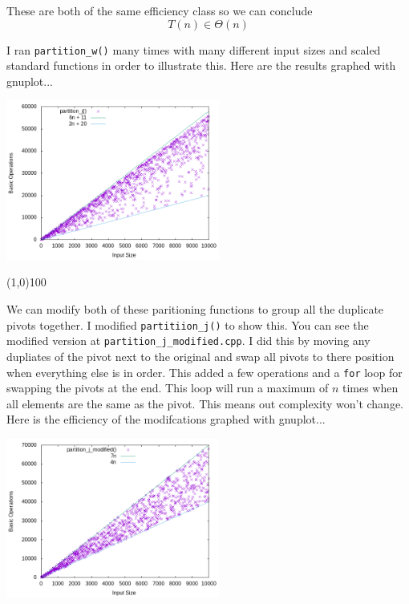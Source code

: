 \documentclass[11pt]{article}
\begin{document}
These are both of the same efficiency class so we can conclude
\[
T(n) \in \Theta(n)
\]

I ran \texttt{partition\_w()} many times with many different input sizes and
scaled standard functions in order to illustrate this. Here are the results
graphed with gnuplot...

\begin{center}
  \includegraphics[width=0.525\textwidth]{p1_2.png}
\end{center}

\begin{center}
\line(1,0){100}
\end{center}

We can modify both of these paritioning functions to group all the duplicate
pivots together. I modified \texttt{partitiion\_j()} to show this. You can see
the modified version at \texttt{partition\_j\_modified.cpp}. I did this by
moving any dupliates of the pivot next to the original and swap all pivots to
there position when everything else is in order. This added a few operations
and a \texttt{for} loop for swapping the pivots at the end. This loop will run
a maximum of $n$ times when all elements are the same as the pivot. This means
out complexity won't change. Here is the efficiency of the modifcations 
graphed with gnuplot...

\begin{center}
  \includegraphics[width=0.525\textwidth]{p2.png}
\end{center}
\end{document}
